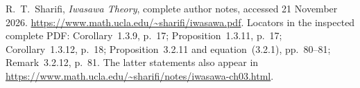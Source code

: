 R.~T.~Sharifi, \emph{Iwasawa Theory}, complete author notes,
accessed 21 November 2026.
\url{https://www.math.ucla.edu/~sharifi/iwasawa.pdf}.
Locators in the inspected complete PDF: Corollary~1.3.9, p.~17;
Proposition~1.3.11, p.~17; Corollary~1.3.12, p.~18;
Proposition~3.2.11 and equation~(3.2.1), pp.~80--81;
Remark~3.2.12, p.~81. The latter statements also appear in
\url{https://www.math.ucla.edu/~sharifi/notes/iwasawa-ch03.html}.
